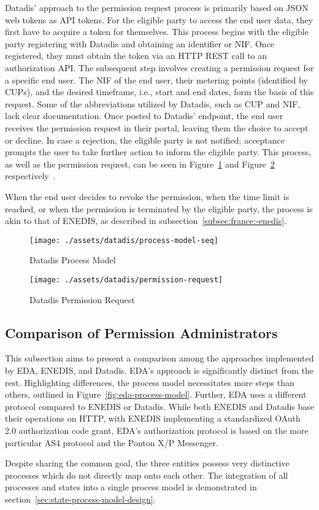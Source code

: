 Datadis' approach to the permission request process is primarily based on JSON web tokens as API tokens.
For the eligible party to access the end user data, they first have to acquire a token for themselves.
This process begins with the eligible party registering with Datadis and obtaining an identifier or NIF.
Once registered, they must obtain the token via an HTTP REST call to an authorization API.
The subsequent step involves creating a permission request for a specific end user.
The NIF of the end user, their metering points (identified by CUPs),
and the desired timeframe, i.e., start and end dates, form the basis of this request.
Some of the abbreviations utilized by Datadis, such as CUP and NIF, lack clear documentation.
Once posted to Datadis' endpoint, the end user receives the permission request in their portal,
leaving them the choice to accept or decline.
In case a rejection, the eligible party is not notified;
acceptance prompts the user to take further action to inform the eligible party.
This process, as well as the permission request,
can be seen in Figure~\ref{fig:datadis-process-model} and Figure~\ref{fig:datadis-permission-request} respectively~\cite{datadis-dev-guide,bprt-issues}.

When the end user decides to revoke the permission,
when the time limit is reached, or when the permission is terminated by the eligible party,
the process is akin to that of ENEDIS,
as described in subsection~\ref{subsec:france:-enedis}.

\begin{figure}[h]
    \texttt{[image: ./assets/datadis/process-model-seq]}
    \caption{Datadis Process Model}
    \label{fig:datadis-process-model}
\end{figure}

\begin{figure}[h]
    \centering \texttt{[image: ./assets/datadis/permission-request]}
    \caption{Datadis Permission Request}
    \label{fig:datadis-permission-request}
\end{figure}

\subsection{Comparison of Permission Administrators}\label{subsec:comparison-of-permission-administrators}
This subsection aims to present a comparison among the approaches implemented by EDA, ENEDIS, and Datadis.
EDA's approach is significantly distinct from the rest.
Highlighting differences, the process model necessitates more steps than others,
outlined in Figure\ \ref{fig:eda-process-model}.
Further, EDA uses a different protocol compared to ENEDIS or Datadis.
While both ENEDIS and Datadis base their operations on HTTP,
with ENEDIS implementing a standardized OAuth 2.0 authorization code grant,
EDA's authorization protocol is based on the more particular AS4 protocol and the Ponton X/P Messenger.

Despite sharing the common goal,
the three entities possess very distinctive processes which do not directly map onto each other.
The integration of all processes and states into a single process model is demonstrated in section\ \ref{sec:state-process-model-design}.